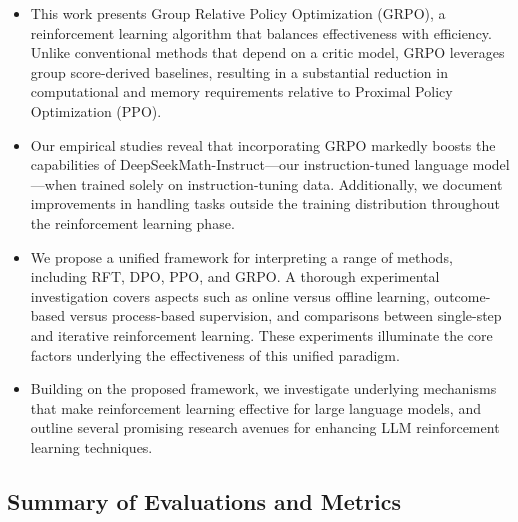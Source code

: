 \begin{itemize}[topsep=0pt]
    \item This work presents Group Relative Policy Optimization (GRPO), a reinforcement learning algorithm that balances effectiveness with efficiency. Unlike conventional methods that depend on a critic model, GRPO leverages group score-derived baselines, resulting in a substantial reduction in computational and memory requirements relative to Proximal Policy Optimization (PPO).
    \item Our empirical studies reveal that incorporating GRPO markedly boosts the capabilities of DeepSeekMath-Instruct—our instruction-tuned language model—when trained solely on instruction-tuning data. Additionally, we document improvements in handling tasks outside the training distribution throughout the reinforcement learning phase.
    \item We propose a unified framework for interpreting a range of methods, including RFT, DPO, PPO, and GRPO. A thorough experimental investigation covers aspects such as online versus offline learning, outcome-based versus process-based supervision, and comparisons between single-step and iterative reinforcement learning. These experiments illuminate the core factors underlying the effectiveness of this unified paradigm.
    \item Building on the proposed framework, we investigate underlying mechanisms that make reinforcement learning effective for large language models, and outline several promising research avenues for enhancing LLM reinforcement learning techniques.
\end{itemize}

\subsection{Summary of Evaluations and Metrics}

